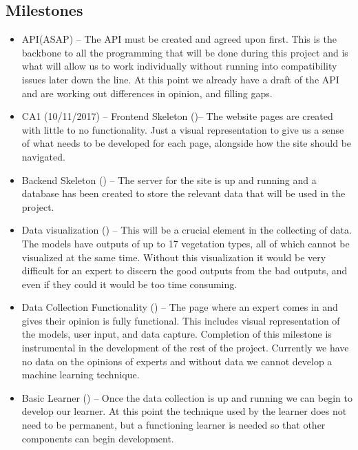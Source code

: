 \documentclass[11pt]{article} %
\numberwithin{equation}{section}
\begin{document}
\subsection{Milestones}

\begin{itemize}

\item API(ASAP) – The API must be created and agreed upon first. This is the backbone to all the programming that will be done during this project and is what will allow us to work individually without running into compatibility issues later down the line. At this point we already have a draft of the API and are working out differences in opinion, and filling gaps.

\item CA1 (10/11/2017) – 
Frontend Skeleton ()– The website pages are created with little to no functionality. Just a visual representation to give us a sense of what needs to be developed for each page, alongside how the site should be navigated.

\item Backend Skeleton () –  The server for the site is up and running and a database has been created to store the relevant data that will be used in the project. 

\item Data visualization () –  This will be a crucial element in the collecting of data. The models have outputs of up to 17 vegetation types, all of which cannot be visualized at the same time. Without this visualization it would be very difficult for an expert to discern the good outputs from the bad outputs, and even if they could it would be too time consuming.

\item Data Collection Functionality () – The page where an expert comes in and gives their opinion is fully functional. This includes visual representation of the models, user input, and data capture. Completion of this milestone is instrumental in the development of the rest of the project. Currently we have no data on the opinions of experts and without data we cannot develop a machine learning technique.

\item Basic Learner () – Once the data collection is up and running we can begin to develop our learner. At this point the technique used by the learner does not need to be permanent, but a functioning learner is needed so that other components can begin development.


\end{itemize}
\end{document}
